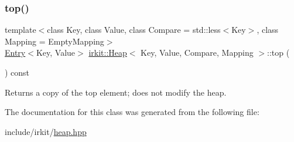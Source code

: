 \mbox{\label{classirkit_1_1Heap_aa14c398611006aa94e2fe24be3cf34ec}} 
\subsubsection{\texorpdfstring{top()}{top()}}
{\footnotesize\ttfamily template$<$class Key, class Value, class Compare = std\+::less$<$\+Key$>$, class Mapping = Empty\+Mapping$>$ \\
\hyperlink{structirkit_1_1Entry}{Entry}$<$Key, Value$>$ \hyperlink{classirkit_1_1Heap}{irkit\+::\+Heap}$<$ Key, Value, Compare, Mapping $>$\+::top (\begin{DoxyParamCaption}{ }\end{DoxyParamCaption}) const\hspace{0.3cm}{\ttfamily [inline]}}



Returns a copy of the top element; does not modify the heap. 



The documentation for this class was generated from the following file\+:\begin{DoxyCompactItemize}
\item 
include/irkit/\hyperlink{heap_8hpp}{heap.\+hpp}\end{DoxyCompactItemize}
